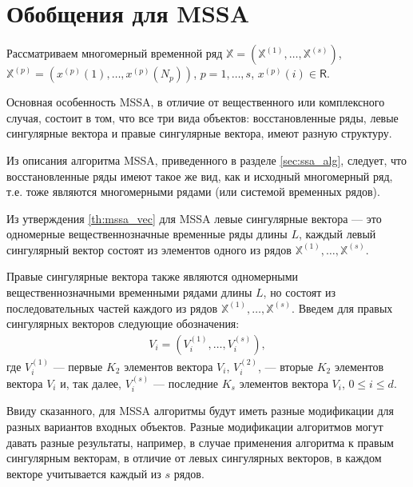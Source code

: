 \documentclass[specialist,
               substylefile = spbu.rtx,
               subf,href,colorlinks=true, 12pt]{disser}
\begin{document}
\section{Обобщения для MSSA}
Рассматриваем многомерный временной ряд $\mathbb{X}= \left(\mathbb{X}^{(1)}, \ldots,\mathbb{X}^{(s)}\right)$,\\ $\mathbb{X}^{(p)}= \left(x^{(p)}(1),\ldots,x^{(p)}(N_p)\right)$, $p=1,\ldots,s$, $x^{(p)}(i) \in \mathsf{R}$. 

Основная особенность MSSA, в отличие от вещественного или комплексного случая, состоит в том, что все три вида объектов: восстановленные ряды, левые сингулярные вектора и правые сингулярные вектора, имеют разную структуру.

Из описания алгоритма MSSA, приведенного в разделе \ref{sec:ssa_alg}, следует, что восстановленные ряды имеют такое же вид, как и исходный многомерный ряд, т.е. тоже являются многомерными рядами (или системой временных рядов). 

Из утверждения \ref{th:mssa_vec} для MSSA левые сингулярные вектора --- это одномерные вещественнозначные временные ряды
 длины $L$, каждый левый сингулярный вектор состоят из элементов одного из рядов $\mathbb{X}^{(1)}, \ldots, \mathbb{X}^{(s)}$. 
 
 Правые сингулярные вектора также являются одномерными вещественнозначными временными рядами длины $L$, но состоят из 
последовательных частей каждого из рядов $\mathbb{X}^{(1)}, \ldots, \mathbb{X}^{(s)}$.
Введем для правых сингулярных векторов следующие обозначения: 
\begin{gather} \label{eq:V_mssa}
{V}_{i} = \left({V}_i^{(1)}, \ldots, {V}_i^{(s)}\right), 
\end{gather}
где $V_i^{(1)}$ --- первые $K_2$ элементов вектора ${V}_{i}$,  $V_i^{(2)}$, --- вторые $K_2$ элементов вектора ${V}_{i}$ и, так далее, $V_i^{(s)}$ --- последние $K_s$ элементов вектора ${V}_{i}$, $0 \leqslant i \leqslant d$. 

Ввиду сказанного, для MSSA алгоритмы будут иметь разные модификации для разных вариантов входных объектов. Разные модификации алгоритмов могут давать разные результаты, например, в случае применения алгоритма к правым сингулярным векторам, в отличие от левых сингулярных векторов, в каждом векторе учитывается каждый из $s$ рядов.  
 
\end{document}
